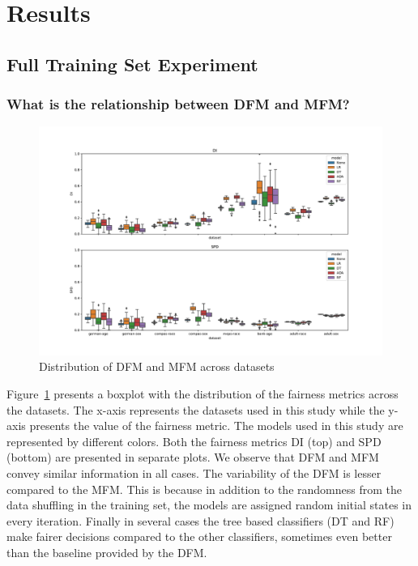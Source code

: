 \documentclass{article}
\begin{document}
\section{Results}\label{sec:results}


\subsection{Full Training Set Experiment}\label{sec:results-full}

\subsubsection{What is the relationship between DFM and MFM?}\label{sec:results-full-rel}

\begin{figure}
  \centering
  \includegraphics[width=0.95\linewidth]{boxplot--dataset--di-spd--exp-full.pdf}
  \caption{Distribution of DFM and MFM across datasets}
  \label{fig:boxplot--dataset--di-spd--exp-full}
\end{figure}

%

Figure \ref{fig:boxplot--dataset--di-spd--exp-full} presents a boxplot
with the distribution of the fairness metrics across the datasets. The
x-axis represents the datasets used in this study while the y-axis
presents the value of the fairness metric. The models used in this
study are represented by different colors. Both the fairness metrics
DI (top) and SPD (bottom) are presented in separate plots. We observe
that DFM and MFM convey similar information in all cases. The
variability of the DFM is lesser compared to the MFM. This is because
in addition to the randomness from the data shuffling in the training
set, the models are assigned random initial states in every
iteration. Finally in several cases the tree based classifiers (DT and
RF) make fairer decisions compared to the other classifiers, sometimes
even better than the baseline provided by the DFM.
\end{document}
